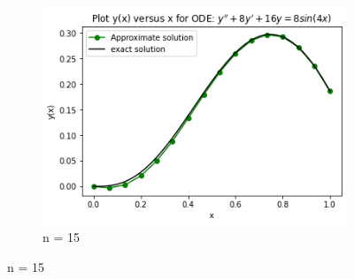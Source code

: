 \documentclass[a4paper,11.5 pt]{article}
\begin{document}
\begin{figure}[htb]
\begin{subfigure}{0.25\textwidth}
  \includegraphics[width=\linewidth]{diagram/n = 15.png}
  \caption{n = 15}
  \label{fig:3}
\end{subfigure}


\end{figure}
\end{document}
